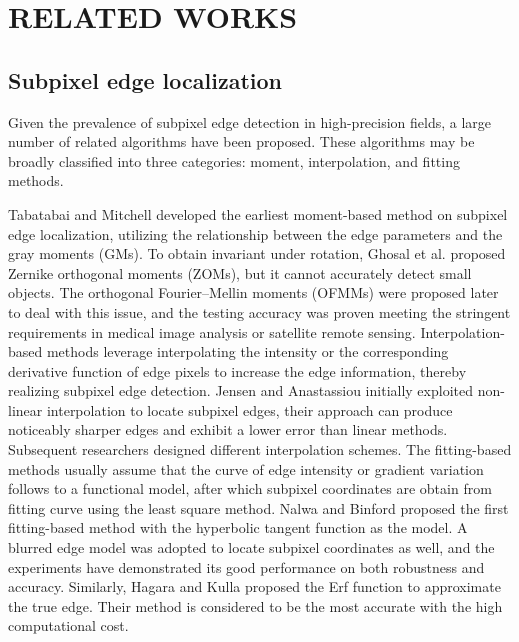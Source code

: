 \section{RELATED WORKS}
\label{sec2}
\subsection{Subpixel edge localization}
Given the prevalence of subpixel edge detection in high-precision fields, a large number of related algorithms have been proposed. These algorithms may be broadly classified into three categories\cite{Fabijaska2015SubpixelED}: moment\cite{tabatabai1984edge,Ghosal1993OrthogonalMO,Bin2008SubpixelEL,Sun2014ARE}, interpolation\cite{Jensen,Qingli2003AIS,Chen201611,Single-Pixel-Multi-Point}, and fitting methods\cite{Nalwa1986699,Duan2018High,Liu2022ANS,2011Edge}.

Tabatabai and Mitchell \cite{tabatabai1984edge} developed the earliest moment-based method on subpixel edge localization, utilizing the relationship between the edge parameters and the gray moments (GMs). 
To obtain invariant under rotation, Ghosal et al.\cite{Ghosal1993OrthogonalMO} proposed Zernike orthogonal moments (ZOMs), but it cannot accurately detect small objects. The orthogonal Fourier–Mellin moments (OFMMs)\cite{Bin2008SubpixelEL} were proposed later to deal with this issue, and the testing accuracy was proven meeting the stringent requirements in medical image analysis or satellite remote sensing. 
Interpolation-based methods leverage interpolating the intensity or the corresponding derivative function of edge pixels to increase the edge information, thereby realizing subpixel edge detection. 
Jensen and Anastassiou\cite{Jensen} initially exploited non-linear interpolation to locate subpixel edges, their approach can produce noticeably sharper edges and exhibit a lower error than linear methods. 
Subsequent researchers designed different interpolation schemes\cite{Qingli2003AIS,Chen201611,Single-Pixel-Multi-Point}. 
The fitting-based methods usually assume that the curve of edge intensity or gradient variation follows to a functional model, after which subpixel coordinates are obtain from fitting curve using the least square method. 
Nalwa and Binford \cite{Nalwa1986699} proposed the first fitting-based method with the hyperbolic tangent function as the model. A blurred edge model \cite{YE2005453} was adopted to locate subpixel coordinates as well, and the experiments have demonstrated its good performance on both robustness and accuracy.
Similarly, Hagara and Kulla\cite{2011Edge} proposed the Erf function to approximate the true edge. Their method is considered to be the most accurate with the high computational cost. 

